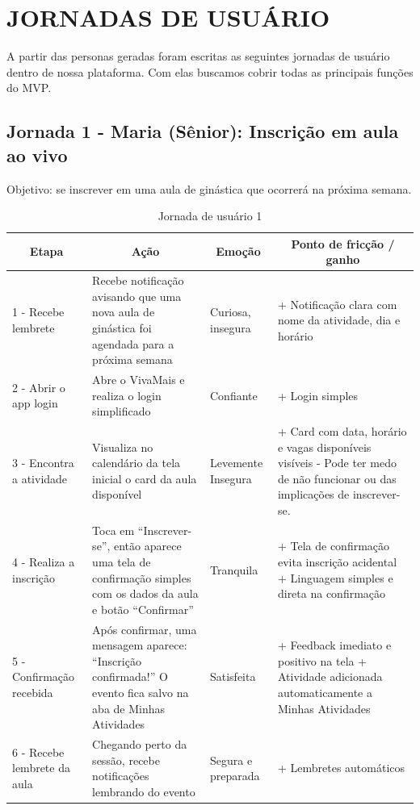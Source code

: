 \newpage
\section{JORNADAS DE USUÁRIO}
A partir das personas geradas foram escritas as seguintes jornadas de usuário dentro de nossa plataforma. Com elas buscamos cobrir todas as principais funções do MVP.

\subsection{Jornada 1 - Maria (Sênior): Inscrição em aula ao vivo}
Objetivo: se inscrever em uma aula de ginástica que ocorrerá na próxima semana.
\begin{table}[H]
\centering
\caption{Jornada de usuário 1}
\label{tab:jornada1}
\begin{tabular}{|m{3.2cm}|m{5cm}|m{2.5cm}|m{4.5cm}|}
\hline
\multicolumn{1}{|c|}{\textbf{Etapa}} & \multicolumn{1}{c|}{\textbf{Ação}} & \multicolumn{1}{c|}{\textbf{Emoção}} & \multicolumn{1}{c|}{\textbf{Ponto de fricção / ganho}} \\ \hline

1 - Recebe lembrete & Recebe notificação avisando que uma nova aula de ginástica foi agendada para a próxima semana & Curiosa, insegura & + Notificação clara com nome da atividade, dia e horário \\ \hline

2 - Abrir o app login & Abre o VivaMais e realiza o login simplificado & Confiante & + Login simples \\ \hline

3 - Encontra a atividade & Visualiza no calendário da tela inicial o card da aula disponível & Levemente Insegura & + Card com data, horário e vagas disponíveis visíveis \newline\newline - Pode ter medo de não funcionar ou das implicações de inscrever-se. \\ \hline

4 - Realiza a inscrição & Toca em ``Inscrever-se'', então aparece uma tela de confirmação simples com os dados da aula e botão ``Confirmar'' & Tranquila & + Tela de confirmação evita inscrição acidental \newline\newline + Linguagem simples e direta na confirmação \\ \hline

5 - Confirmação recebida & Após confirmar, uma mensagem aparece: ``Inscrição confirmada!'' O evento fica salvo na aba de Minhas Atividades & Satisfeita & + Feedback imediato e positivo na tela \newline\newline + Atividade adicionada automaticamente a Minhas Atividades \\ \hline

6 - Recebe lembrete da aula & Chegando perto da sessão, recebe notificações lembrando do evento & Segura e preparada & + Lembretes automáticos \\ \hline
\end{tabular}
\end{table}

